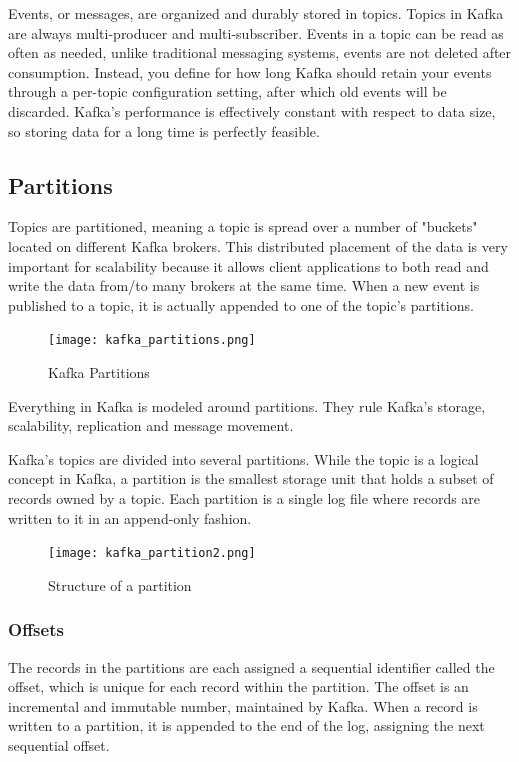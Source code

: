 Events, or messages, are organized and durably stored in topics.
Topics in Kafka are always multi-producer and multi-subscriber.
Events in a topic can be read as often as needed, unlike traditional messaging
systems, events are not deleted after consumption. Instead, you define for how
long Kafka should retain your events through a per-topic configuration setting,
after which old events will be discarded. Kafka's performance is effectively
constant with respect to data size, so storing data for a long time is
perfectly feasible.

\subsection{Partitions}

Topics are partitioned, meaning a topic is spread over a number of "buckets"
located on different Kafka brokers.
This distributed placement of the data is very important for scalability
because it allows client applications to both read and write the data from/to
many brokers at the same time. When a new event is published to a topic, it is
actually appended to one of the topic's partitions.

\begin{figure}[ht]
    \centering
    \texttt{[image: kafka\_partitions.png]}
    \caption{Kafka Partitions}
\end{figure}

Everything in Kafka is modeled around partitions. They rule Kafka's storage,
scalability, replication and message movement.

Kafka's topics are divided into several partitions. While the topic is a
logical concept in Kafka, a partition is the smallest storage unit that holds
a subset of records owned by a topic. Each partition is a single log file
where records are written to it in an append-only fashion.

\begin{figure}[ht]
    \centering
    \texttt{[image: kafka\_partition2.png]}
    \caption{Structure of a partition}
\end{figure}

\subsubsection{Offsets}

The records in the partitions are each assigned a sequential identifier
called the offset, which is unique for each record within the partition.
The offset is an incremental and immutable number, maintained by Kafka.
When a record is written to a partition, it is appended to the end of the log,
assigning the next sequential offset.

